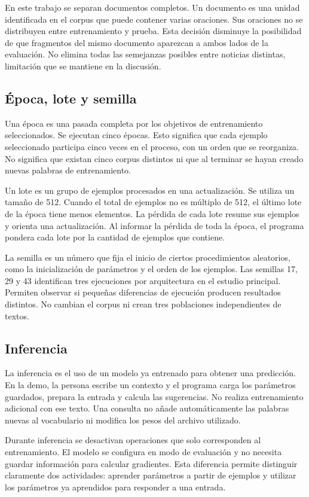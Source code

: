 En este trabajo se separan documentos completos. Un documento es una unidad identificada en el corpus que puede contener varias oraciones. Sus oraciones no se distribuyen entre entrenamiento y prueba. Esta decisión disminuye la posibilidad de que fragmentos del mismo documento aparezcan a ambos lados de la evaluación. No elimina todas las semejanzas posibles entre noticias distintas, limitación que se mantiene en la discusión.

\subsection{Época, lote y semilla}
Una época es una pasada completa por los objetivos de entrenamiento seleccionados. Se ejecutan cinco épocas. Esto significa que cada ejemplo seleccionado participa cinco veces en el proceso, con un orden que se reorganiza. No significa que existan cinco corpus distintos ni que al terminar se hayan creado nuevas palabras de entrenamiento.

Un lote es un grupo de ejemplos procesados en una actualización. Se utiliza un tamaño de 512. Cuando el total de ejemplos no es múltiplo de 512, el último lote de la época tiene menos elementos. La pérdida de cada lote resume sus ejemplos y orienta una actualización. Al informar la pérdida de toda la época, el programa pondera cada lote por la cantidad de ejemplos que contiene.

La semilla es un número que fija el inicio de ciertos procedimientos aleatorios, como la inicialización de parámetros y el orden de los ejemplos. Las semillas 17, 29 y 43 identifican tres ejecuciones por arquitectura en el estudio principal. Permiten observar si pequeñas diferencias de ejecución producen resultados distintos. No cambian el corpus ni crean tres poblaciones independientes de textos.

\subsection{Inferencia}
La inferencia es el uso de un modelo ya entrenado para obtener una predicción. En la demo, la persona escribe un contexto y el programa carga los parámetros guardados, prepara la entrada y calcula las sugerencias. No realiza entrenamiento adicional con ese texto. Una consulta no añade automáticamente las palabras nuevas al vocabulario ni modifica los pesos del archivo utilizado.

Durante inferencia se desactivan operaciones que solo corresponden al entrenamiento. El modelo se configura en modo de evaluación y no necesita guardar información para calcular gradientes. Esta diferencia permite distinguir claramente dos actividades: aprender parámetros a partir de ejemplos y utilizar los parámetros ya aprendidos para responder a una entrada.
